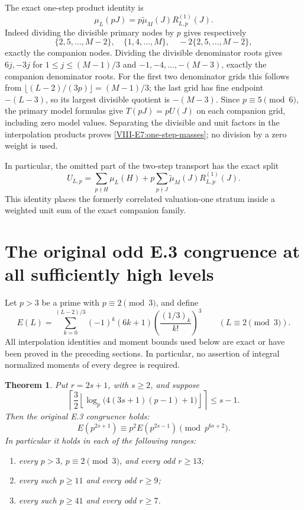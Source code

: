 \documentclass[11pt,letterpaper]{article}
\newtheorem{theorem}{Theorem}[section]
\numberwithin{equation}{section}
\begin{document}
The exact one-step product identity is
\begin{equation}\label{VIII-E7:one-step-masses}
 \mu_L(pJ)=p\widetilde\mu_M(J)R^{(1)}_{L,p}(J).
\end{equation}
Indeed dividing the divisible primary nodes by $p$ gives respectively
\[
 \{2,5,\ldots,M-2\},\quad
 \{1,4,\ldots,M\},\quad
 -2\{2,5,\ldots,M-2\},
\]
exactly the companion nodes. Dividing the divisible denominator roots
gives $6j,-3j$ for $1\le j\le(M-1)/3$ and
$-1,-4,\ldots,-(M-3)$, exactly the companion denominator roots.
For the first two denominator grids this follows from
$\lfloor(L-2)/(3p)\rfloor=(M-1)/3$; the last grid has fine endpoint
$-(L-3)$, so its largest divisible quotient is $-(M-3)$.
Since $p\equiv5\pmod6$, the primary model formulas give
$T(pJ)=pU(J)$ on each companion grid, including zero model values.
Separating the divisible and unit factors in the interpolation products
proves \eqref{VIII-E7:one-step-masses}; no division by a zero weight is used.

In particular, the omitted part of the two-step transport has the exact
split
\begin{equation}\label{VIII-E7:U-one-step}
 U_{L,p}
 =\sum_{p\nmid H}\mu_L(H)
 +p\sum_{p\nmid J}\widetilde\mu_M(J)R^{(1)}_{L,p}(J).
\end{equation}
This identity places the formerly correlated valuation-one stratum
inside a weighted unit sum of the exact companion family.


\section{The original odd E.3 congruence at all sufficiently high levels}\label{loc-VIII-10}
\label{VIII-sec:e-high-level-closure}
Let $p>3$ be a prime with $p\equiv2\pmod3$, and define
\[
 E(L)=\sum_{k=0}^{(L-2)/3}(-1)^k(6k+1)
          \left(\frac{(1/3)_k}{k!}\right)^3
 \qquad(L\equiv2\pmod3).
\]
All interpolation identities and moment bounds used below are exact
or have been proved in the preceding sections. In particular, no
assertion of integral normalized moments of every degree is required.

\begin{theorem}\label{VIII-thm:e-high-level-closure}
Put $r=2s+1$, with $s\ge2$, and suppose
\begin{equation}\label{VIII-eq:e-improved-threshold}
 \left\lceil\frac32\left\lfloor
 \log_p\bigl(4(3s+1)(p-1)+1\bigr)\right\rfloor\right\rceil
 \le s-1.
\end{equation}
Then the original E.3 congruence holds:
\[
 \boxed{E(p^{2s+1})\equiv p^2E(p^{2s-1})\pmod{p^{6s+2}}.}
\]
In particular it holds in each of the following ranges:
\begin{enumerate}
 \item every $p>3$, $p\equiv2\pmod3$, and every odd $r\ge13$;
 \item every such $p\ge11$ and every odd $r\ge9$;
 \item every such $p\ge41$ and every odd $r\ge7$.
\end{enumerate}
\end{theorem}
\end{document}
